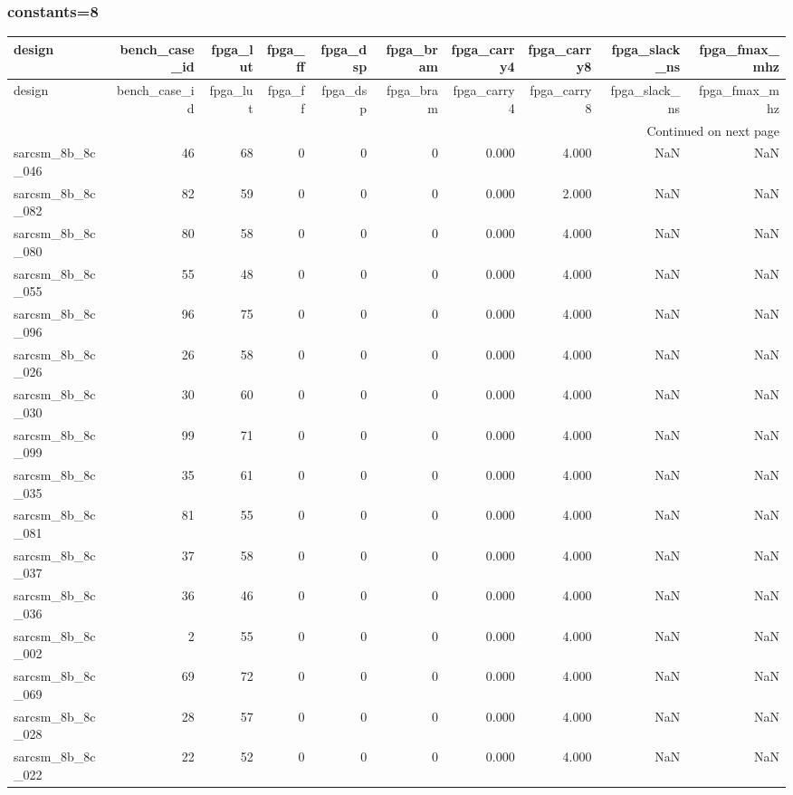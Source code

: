 \documentclass{article}
\begin{document}
\subsubsection*{constants=8}
\begin{longtable}{lrrrrrrrrr}
\toprule
design & bench\_case\_id & fpga\_lut & fpga\_ff & fpga\_dsp & fpga\_bram & fpga\_carry4 & fpga\_carry8 & fpga\_slack\_ns & fpga\_fmax\_mhz \\
\midrule
\endfirsthead
\toprule
design & bench\_case\_id & fpga\_lut & fpga\_ff & fpga\_dsp & fpga\_bram & fpga\_carry4 & fpga\_carry8 & fpga\_slack\_ns & fpga\_fmax\_mhz \\
\midrule
\endhead
\midrule
\multicolumn{10}{r}{Continued on next page} \\
\midrule
\endfoot
\bottomrule
\endlastfoot
sarcsm\_8b\_8c\_046 & 46 & 68 & 0 & 0 & 0 & 0.000 & 4.000 & NaN & NaN \\
sarcsm\_8b\_8c\_082 & 82 & 59 & 0 & 0 & 0 & 0.000 & 2.000 & NaN & NaN \\
sarcsm\_8b\_8c\_080 & 80 & 58 & 0 & 0 & 0 & 0.000 & 4.000 & NaN & NaN \\
sarcsm\_8b\_8c\_055 & 55 & 48 & 0 & 0 & 0 & 0.000 & 4.000 & NaN & NaN \\
sarcsm\_8b\_8c\_096 & 96 & 75 & 0 & 0 & 0 & 0.000 & 4.000 & NaN & NaN \\
sarcsm\_8b\_8c\_026 & 26 & 58 & 0 & 0 & 0 & 0.000 & 4.000 & NaN & NaN \\
sarcsm\_8b\_8c\_030 & 30 & 60 & 0 & 0 & 0 & 0.000 & 4.000 & NaN & NaN \\
sarcsm\_8b\_8c\_099 & 99 & 71 & 0 & 0 & 0 & 0.000 & 4.000 & NaN & NaN \\
sarcsm\_8b\_8c\_035 & 35 & 61 & 0 & 0 & 0 & 0.000 & 4.000 & NaN & NaN \\
sarcsm\_8b\_8c\_081 & 81 & 55 & 0 & 0 & 0 & 0.000 & 4.000 & NaN & NaN \\
sarcsm\_8b\_8c\_037 & 37 & 58 & 0 & 0 & 0 & 0.000 & 4.000 & NaN & NaN \\
sarcsm\_8b\_8c\_036 & 36 & 46 & 0 & 0 & 0 & 0.000 & 4.000 & NaN & NaN \\
sarcsm\_8b\_8c\_002 & 2 & 55 & 0 & 0 & 0 & 0.000 & 4.000 & NaN & NaN \\
sarcsm\_8b\_8c\_069 & 69 & 72 & 0 & 0 & 0 & 0.000 & 4.000 & NaN & NaN \\
sarcsm\_8b\_8c\_028 & 28 & 57 & 0 & 0 & 0 & 0.000 & 4.000 & NaN & NaN \\
sarcsm\_8b\_8c\_022 & 22 & 52 & 0 & 0 & 0 & 0.000 & 4.000 & NaN & NaN \\

\end{longtable}
\end{document}
